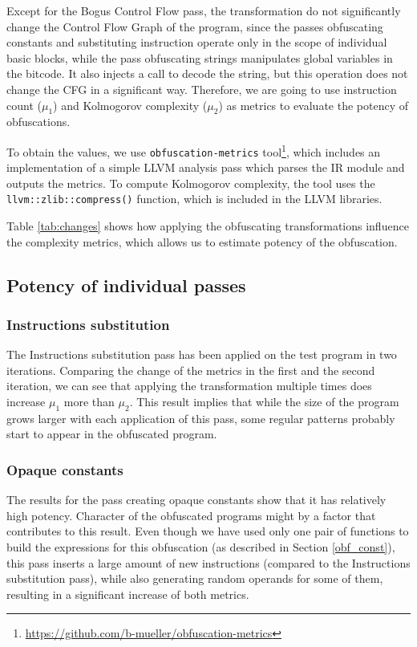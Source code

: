 \documentclass[
  digital, %
  notable,   %
  twoside, %
  nolof,     %
  nolot,     %
]{fithesis3}
\theoremstyle{definition}
\begin{document}
Except for the Bogus Control Flow pass, the transformation do not significantly change the Control Flow Graph of the program, since the passes obfuscating constants and substituting instruction operate only in the scope of individual basic blocks, while the pass obfuscating strings manipulates global variables in the bitcode. It also injects a call to decode the string, but this operation does not change the CFG in a significant way. Therefore, we are going to use instruction count ($\mu_1$) and Kolmogorov complexity ($\mu_2$) as metrics to evaluate the potency of obfuscations. 

To obtain the values, we use \texttt{obfuscation-metrics} tool\footnote{\url{https://github.com/b-mueller/obfuscation-metrics}}, which includes an implementation of a simple LLVM analysis pass which parses the IR module and outputs the metrics. To compute Kolmogorov complexity, the tool uses the \texttt{llvm::zlib::compress()} function, which is included in the LLVM libraries. 

Table \ref{tab:changes} shows how applying the obfuscating transformations influence the complexity metrics, which allows us to estimate potency of the obfuscation. 

\subsection{Potency of individual passes}

\subsubsection{Instructions substitution}
The Instructions substitution pass has been applied on the test program in two iterations. Comparing the change of the metrics in the first and the second iteration, we can see that applying the transformation multiple times does increase $\mu_1$ more than $\mu_2$. This result implies that while the size of the program grows larger with each application of this pass, some regular patterns probably start to appear in the obfuscated program.

\subsubsection{Opaque constants}
The results for the pass creating opaque constants show that it has relatively high potency. Character of the obfuscated programs might by a factor that contributes to this result. Even though we have used only one pair of functions to build the expressions for this obfuscation (as described in Section \ref{obf_const}), this pass inserts a large amount of new instructions (compared to the Instructions substitution pass), while also generating random operands for some of them, resulting in a significant increase of both metrics. 
\end{document}
